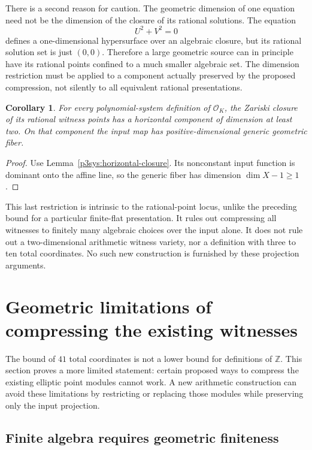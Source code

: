 \documentclass[11pt]{article}
\newtheorem{corollary}[theorem]{Corollary}
\theoremstyle{definition}
\begin{document}
There is a second reason for caution.  The geometric dimension of
one equation need not be the dimension of the closure of its rational
solutions.  The equation
\[
                         U^2+V^2=0
\]
defines a one-dimensional hypersurface over an algebraic closure,
but its rational solution set is just $(0,0)$.  Therefore a large
geometric source can in principle have its rational points confined
to a much smaller algebraic set.  The dimension restriction must
be applied to a component actually preserved by the proposed
compression, not silently to all equivalent rational presentations.

\begin{corollary}\label{p3sys:arithmetic-dimension-floor}
For every polynomial-system definition of $\mathcal O_K$, the
Zariski closure of its rational witness points has a horizontal
component of dimension at least two.  On that component the input
map has positive-dimensional generic geometric fiber.
\end{corollary}
\begin{proof}
Use Lemma~\ref{p3sys:horizontal-closure}.  Its nonconstant input
function is dominant onto the affine line, so the generic fiber
has dimension $\dim X-1\ge1$.
\end{proof}

This last restriction is intrinsic to the rational-point locus,
unlike the preceding bound for a particular finite-flat presentation.
It rules out compressing all witnesses to finitely many algebraic
choices over the input alone.  It does not rule out a two-dimensional
arithmetic witness variety, nor a definition with three to ten total
coordinates.  No such new construction is furnished by these
projection arguments.


\section{Geometric limitations of compressing the existing witnesses}
\label{sec:geometric-compression-limits}

The bound of $41$ total coordinates is not a lower bound for
definitions of $\mathbb Z$.  This section proves a more limited
statement: certain proposed ways to compress the existing elliptic
point modules cannot work.  A new arithmetic construction can avoid
these limitations by restricting or replacing those modules while
preserving only the input projection.

\subsection{Finite algebra requires geometric finiteness}
\end{document}

